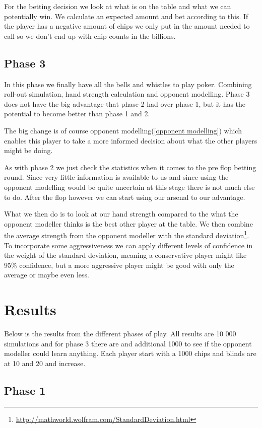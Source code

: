 \documentclass[titlepage, a4paper]{article}
\begin{document}
For the betting decision we look at what is on the table and what we can potentially
win. We calculate an expected amount and bet according to this. If the player has a negative
amount of chips we only put in the amount needed to call so we don't end up with chip counts in the
billions.


\subsection{Phase 3}\label{phase 3 player}
In this phase we finally have all the bells and whistles to play poker. Combining
roll-out simulation, hand strength calculation and opponent modelling. Phase 3 does
not have the big advantage that phase 2 had over phase 1, but it has the potential
to become better than phase 1 and 2.

The big change is of course opponent modelling(\ref{opponent modelling}) which enables
this player to take a more informed decision about what the other players might be
doing.

As with phase 2 we just check the statistics when it comes to the pre flop betting round.
Since very little information is available to us and since using the opponent modelling
would be quite uncertain at this stage there is not much else to do. After the
flop however we can start using our arsenal to our advantage.

What we then do is
to look at our hand strength compared to the what the opponent modeller thinks is
the best other player at the table. We then combine the average strength from the
opponent modeller with the standard deviation\footnote{\url{http://mathworld.wolfram.com/StandardDeviation.html}}. To incorporate some aggressiveness we can apply different levels of confidence
in the weight of the standard deviation, meaning a conservative player might like
95\% confidence, but a more aggressive player might be good with only the average
or maybe even less.

 
\section{Results}\label{results}
Below is the results from the different phases of play. All results are 10 000 simulations
and for phase 3 there are and additional 1000 to see if the opponent modeller could learn
anything. Each player start with a 1000 chips and blinds are at 10 and 20 and increase.

\subsection{Phase 1}\label{phase 1 results}
\end{document}
